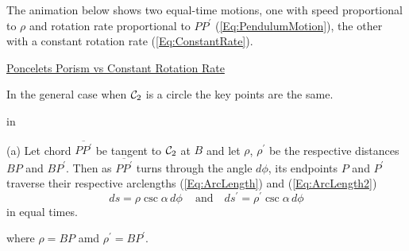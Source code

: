 \documentclass{ximera}
\newcommand{\pskip}{\vskip 0.1 in}
\begin{document}
\begin{exploration}
The animation below shows two equal-time motions, one with speed proportional to $\rho$ and rotation rate proportional to $PP^\prime$ (\ref{Eq:PendulumMotion}), the other with a constant rotation rate (\ref{Eq:ConstantRate}). 
\begin{onlineOnly}
    \begin{center}
\end{center}
\end{onlineOnly}

\href{https://www.desmos.com/calculator/xifdeg3wsq}{Poncelets Porism vs Constant Rotation Rate}

\end{exploration}







In the general case when ${\cal C}_2$ is a circle the key points are the same. %

\pskip

(a) Let chord $\overline{PP^\prime}$ be tangent to ${\cal C}_2$ at $B$ and let $\rho$, $\rho^\prime$ be the respective distances $BP$ and $BP^\prime$. Then as $\overline{PP^\prime}$ turns through the angle $d\phi$, its endpoints $P$ and $P^\prime$ traverse their respective arclengths (\ref{Eq:ArcLength}) and (\ref{Eq:ArcLength2})
\[
     ds = \rho \csc \alpha \, d\phi \,\,\,\,\, \text{ and } \,\,\,\, ds^\prime = \rho^\prime \csc \alpha \, d\phi
\]  
in equal times.

where $\rho = BP$ amd $\rho^\prime =  BP^\prime$.
\end{document}
